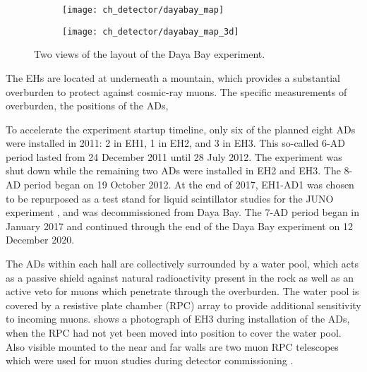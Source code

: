 \begin{figure}
    \centering
    \begin{subfigure}{0.49\textwidth}
        \texttt{[image: ch\_detector/dayabay\_map]}
    \end{subfigure}
    \begin{subfigure}{0.49\textwidth}
        \texttt{[image: ch\_detector/dayabay\_map\_3d]}
    \end{subfigure}
    \caption[Daya Bay geographic layout]{Two views of the layout of the Daya Bay experiment.}
    \label{fig:layout}
\end{figure}

The EHs are located at underneath a mountain, which provides a substantial
overburden to protect against cosmic-ray muons.
The specific measurements of overburden, the positions of the ADs,


To accelerate the experiment startup timeline,
only six of the planned eight ADs were installed in 2011:
2 in EH1, 1 in EH2, and 3 in EH3.
This so-called 6-AD period lasted from 24 December 2011 until 28 July 2012. %
The experiment was shut down while the remaining two ADs were installed
in EH2 and EH3.
The 8-AD period began on 19 October 2012.
At the end of 2017, EH1-AD1 was chosen to be repurposed as a test stand
for liquid scintillator studies for the JUNO experiment \cite{junoproposal2016},
and was decommissioned from Daya Bay.
The 7-AD period began in January 2017 and continued through the end of
the Daya Bay experiment on 12 December 2020.

The ADs within each hall are collectively surrounded by a water pool,
which acts as a passive shield against natural radioactivity present in the rock
as well as an active veto for muons which penetrate through the overburden.
The water pool is covered by a resistive plate chamber (RPC) array
to provide additional sensitivity to incoming muons.
 shows a photograph of EH3 during installation of the ADs,
when the RPC had not yet been moved into position to cover the water pool.
Also visible mounted to the near and far walls are two muon RPC telescopes
which were used for muon studies during detector commissioning \cite{muonsystem2015}.


